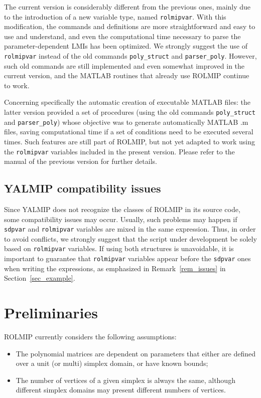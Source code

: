 \documentclass[english,11pt]{article}
\theoremstyle{break} \theorembodyfont{\small\rm}
\begin{document}
The current version is considerably different from the previous ones, mainly due to the introduction of a
new variable type, named \texttt{rolmipvar}. With this modification, the commands and definitions are more
straightforward and easy to use and understand, and even the computational time necessary to parse the parameter-dependent LMIs has been optimized. 
We strongly suggest the use of \texttt{rolmipvar} instead of the old commands \texttt{poly\_struct} and \texttt{parser\_poly}.
However, such old commands are still implemented and even somewhat improved in the current version, and the MATLAB routines that already
use ROLMIP continue to work.

Concerning specifically the automatic creation of executable MATLAB files: the latter version 
provided a set of procedures (using the old commands \texttt{poly\_struct} and \texttt{parser\_poly})
whose objective was to generate automatically MATLAB .m files, saving computational time if a
set of conditions need to be executed several times. Such features are still part of ROLMIP, but not yet
adapted to work using the \texttt{rolmipvar} variables included in the present version. Please
refer to the manual of the previous version for further details.

\subsection{YALMIP compatibility issues}

Since YALMIP does not recognize the classes of ROLMIP in its source code, some compatibility issues may occur. Usually, such
problems may happen if \texttt{sdpvar} and \texttt{rolmipvar} variables are mixed in the same expression. Thus,
in order to avoid conflicts, we strongly suggest that
the script under development be solely based on \texttt{rolmipvar} variables. If using
both structures is unavoidable, it is important to guarantee that \texttt{rolmipvar} variables
appear before the \texttt{sdpvar} ones when writing the expressions, as emphasized in Remark~\ref{rem_issues} in Section~\ref{sec_example}.

\newpage

\section{Preliminaries}\label{sec_preliminaries}

ROLMIP currently considers the following assumptions:
\begin{itemize}
\item The polynomial matrices are dependent on parameters that either are 
defined over a unit (or multi) simplex domain, or have known bounds;

\item The number of vertices of a given simplex is always the same, although different
simplex domains may present different numbers of vertices.
\end{itemize}
\end{document}

